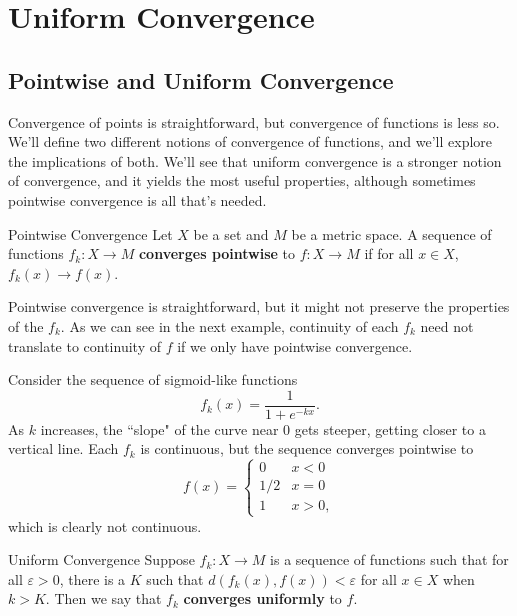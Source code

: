 \documentclass[10pt]{report}
\begin{document}

\chapter{Uniform Convergence}


\section{Pointwise and Uniform Convergence}

Convergence of points is straightforward, but convergence of functions is less so. We'll define two different notions of convergence of functions, and we'll explore the implications of both. We'll see that uniform convergence is a stronger notion of convergence, and it yields the most useful properties, although sometimes pointwise convergence is all that's needed.

\begin{defn}{Pointwise Convergence}{}
	Let $X$ be a set and $M$ be a metric space. A sequence of functions $f_k : X \to M$ \textbf{converges pointwise} to $f:X \to M$ if for all $x \in X$, $f_k(x) \to f(x)$.
\end{defn}

Pointwise convergence is straightforward, but it might not preserve the properties of the $f_k$. As we can see in the next example, continuity of each $f_k$ need not translate to continuity of $f$ if we only have pointwise convergence.

\begin{ex}{}{}
Consider the sequence of sigmoid-like functions
\[
	f_k(x) = \frac{1}{1+e^{-kx}} .
\] As $k$ increases, the ``slope" of the curve near 0 gets steeper, getting closer to a vertical line. Each $f_k$ is continuous, but the sequence converges pointwise to
\[
	f(x) =
	\begin{cases}
		0 & x < 0 \\
		1/2 & x=0 \\
		1 & x>0,
	\end{cases}
\] which is clearly not continuous.
\end{ex}

\begin{defn}{Uniform Convergence}{}
	Suppose $f_k : X \to M$ is a sequence of functions such that for all $\varepsilon>0$, there is a $K$ such that $d(f_k(x), f(x)) < \varepsilon$ for all $x \in X$ when $k > K$. Then we say that $f_k$ \textbf{converges uniformly} to $f$.
\end{defn}
\end{document}
